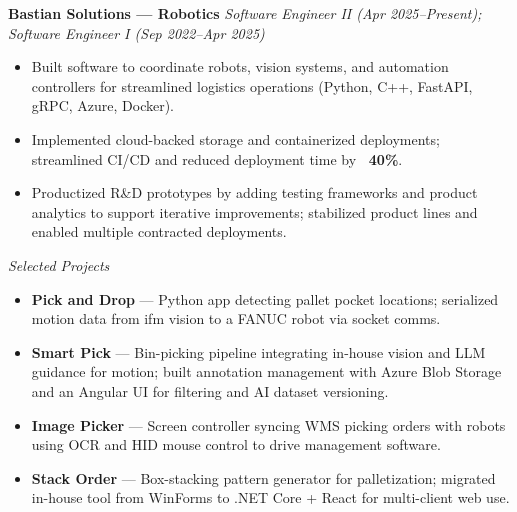 \documentclass[letterpaper,10pt]{article}
\begin{document}
\textbf{Bastian Solutions — Robotics} \hfill \textit{Software Engineer II (Apr 2025–Present); Software Engineer I (Sep 2022–Apr 2025)}\\[-0.25em]
\begin{itemize}
    \item Built software to coordinate robots, vision systems, and automation controllers for streamlined logistics operations (Python, C++, FastAPI, gRPC, Azure, Docker).
    \item Implemented cloud-backed storage and containerized deployments; streamlined CI/CD and reduced deployment time by \textbf{~40\%}.
    \item Productized R\&D prototypes by adding testing frameworks and product analytics to support iterative improvements; stabilized product lines and enabled multiple contracted deployments.
\end{itemize}
\textit{Selected Projects}
\begin{itemize}
    \item \textbf{Pick and Drop} — Python app detecting pallet pocket locations; serialized motion data from ifm vision to a FANUC robot via socket comms.
    \item \textbf{Smart Pick} — Bin-picking pipeline integrating in-house vision and LLM guidance for motion; built annotation management with Azure Blob Storage and an Angular UI for filtering and AI dataset versioning.
    \item \textbf{Image Picker} — Screen controller syncing WMS picking orders with robots using OCR and HID mouse control to drive management software.
    \item \textbf{Stack Order} — Box-stacking pattern generator for palletization; migrated in-house tool from WinForms to .NET Core + React for multi-client web use.
\end{itemize}
\end{document}
